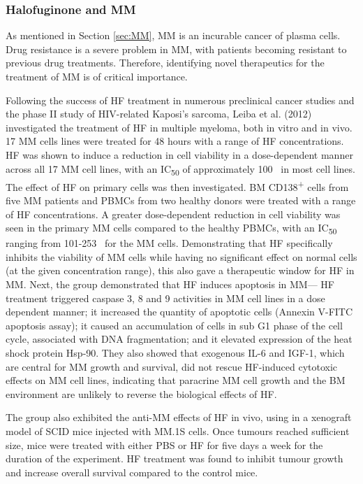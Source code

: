 \subsubsection{Halofuginone and MM}\label{subsec:HF_MM}

As mentioned in Section \ref{sec:MM}, MM is an incurable cancer of plasma cells.
Drug resistance is a severe problem in MM, with patients becoming resistant to previous drug treatments.
Therefore, identifying novel therapeutics for the treatment of MM is of critical importance.

Following the success of HF treatment in numerous preclinical cancer studies and the phase II study of HIV-related Kaposi's sarcoma\cite{koon2011phase}, Leiba et al. (2012) investigated the treatment of HF in multiple myeloma, both in vitro and in vivo\cite{leiba2012halofuginone}.
17 MM cells lines were treated for 48 hours with a range of HF concentrations.
HF was shown to induce a reduction in cell viability in a dose-dependent manner across all 17 MM cell lines, with an IC\textsubscript{50} of approximately 100\si{\nano\Molar} in most cell lines.
The effect of HF on primary cells was then investigated.
BM CD138\textsuperscript{+} cells from five MM patients and PBMCs from two healthy donors were treated with a range of HF concentrations.
A greater dose-dependent reduction in cell viability was seen in the primary MM cells compared to the healthy PBMCs, with an IC\textsubscript{50} ranging from 101-253\si{\nano\Molar} for the MM cells.
Demonstrating that HF specifically inhibits the viability of MM cells while having no significant effect on normal cells (at the given concentration range), this also gave a therapeutic window for HF in MM\@.
Next, the group demonstrated that HF induces apoptosis in MM--- HF treatment triggered caspase 3, 8 and 9 activities in MM cell lines in a dose dependent manner; it increased the quantity of apoptotic cells (Annexin V-FITC apoptosis assay); it caused an accumulation of cells in sub G1 phase of the cell cycle, associated with DNA fragmentation; and it elevated expression of the heat shock protein Hsp-90.
They also showed that exogenous IL-6 and IGF-1, which are central for MM growth and survival, did not rescue HF-induced cytotoxic effects on MM cell lines, indicating that paracrine MM cell growth and the BM environment are unlikely to reverse the biological effects of HF.

The group also exhibited the anti-MM effects of HF in vivo, using in a xenograft model of SCID mice injected with MM.1S cells.
Once tumours reached sufficient size, mice were treated with either PBS or HF for five days a week for the duration of the experiment.
HF treatment was found to inhibit tumour growth and increase overall survival compared to the control mice.

